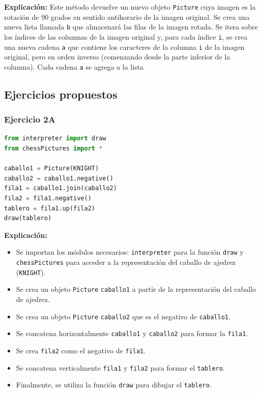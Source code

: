 \documentclass{article}
\begin{document}
\begin{itemize}
\textbf{Explicación:}
Este método devuelve un nuevo objeto \texttt{Picture} cuya imagen es la rotación de 90 grados en sentido antihorario de la imagen original. Se crea una nueva lista llamada \texttt{b} que almacenará las filas de la imagen rotada. Se itera sobre los índices de las columnas de la imagen original y, para cada índice \texttt{i}, se crea una nueva cadena \texttt{a} que contiene los caracteres de la columna \texttt{i} de la imagen original, pero en orden inverso (comenzando desde la parte inferior de la columna). Cada cadena \texttt{a} se agrega a la lista \text



\subsection{Ejercicios propuestos}

\subsubsection{Ejercicio 2A}

\begin{lstlisting}[language=Python, caption={Código del ejercicio 2A}]
from interpreter import draw
from chessPictures import *

caballo1 = Picture(KNIGHT)
caballo2 = caballo1.negative()
fila1 = caballo1.join(caballo2)
fila2 = fila1.negative()
tablero = fila1.up(fila2)
draw(tablero)
\end{lstlisting}

\textbf{Explicación:}
\begin{itemize}
    \item Se importan los módulos necesarios: \texttt{interpreter} para la función \texttt{draw} y \texttt{chessPictures} para acceder a la representación del caballo de ajedrez (\texttt{KNIGHT}).
    \item Se crea un objeto \texttt{Picture} \texttt{caballo1} a partir de la representación del caballo de ajedrez.
    \item Se crea un objeto \texttt{Picture} \texttt{caballo2} que es el negativo de \texttt{caballo1}.
    \item Se concatena horizontalmente \texttt{caballo1} y \texttt{caballo2} para formar la \texttt{fila1}.
    \item Se crea \texttt{fila2} como el negativo de \texttt{fila1}.
    \item Se concatena verticalmente \texttt{fila1} y \texttt{fila2} para formar el \texttt{tablero}.
    \item Finalmente, se utiliza la función \texttt{draw} para dibujar el \texttt{tablero}.
\end{itemize}


\end{itemize}
\end{document}
